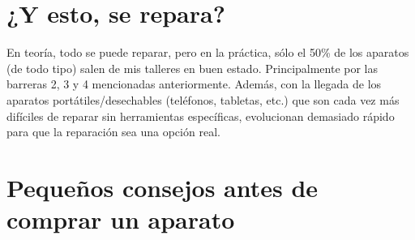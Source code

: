\documentclass[a5paper,twoside,openany]{book}
\begin{document}
\section{¿Y esto, se repara?}
En teoría, todo se puede reparar, pero en la práctica, sólo el 50\% de los aparatos (de todo tipo) salen de mis talleres en buen estado.
Principalmente por las barreras 2, 3 y 4 mencionadas anteriormente.
Además, con la llegada de los aparatos portátiles/desechables (teléfonos, tabletas, etc.)
que son cada vez más difíciles de reparar sin herramientas específicas, evolucionan demasiado rápido
para que la reparación sea una opción real.

\section{Pequeños consejos antes de comprar un aparato}
\end{document}
